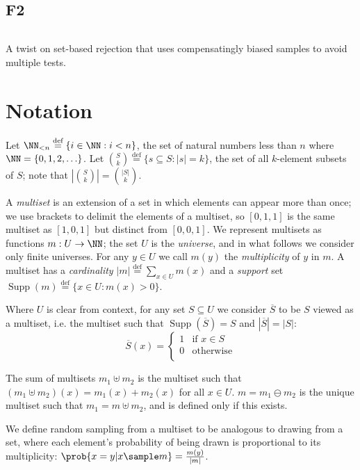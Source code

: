 \documentclass[letterpaper,luatex,11pt]{article}
\newcommand*{\defeq}{\stackrel{\text{def}}{=}}
\DeclareMathOperator{\Supp}{Supp}
\begin{document}
\subsection{F2}
\inputminted{Python}{code/floydf2.py}
A twist on set-based rejection that uses compensatingly biased
samples to avoid multiple tests.
\cite{floydf2}

\section{Notation}

Let \(\NN_{<n} \defeq \{i \in \NN: i < n\}\), the set of natural numbers less than \(n\)
where \(\NN = \{0, 1, 2, \ldots\}\). 
Let \(\binom{S}{k} \defeq \{s \subseteq S: |s| = k\}\), the set of all \(k\)-element subsets
of \(S\); note that \(\left|\binom{S}{k}\right| = \binom{|S|}{k}\).

A \emph{multiset} is an extension of a set in which elements can appear more than once;
we use brackets to delimit the elements of a multiset, so
$[0, 1, 1]$ is the same multiset as $[1, 0, 1]$ but distinct from $[0, 0, 1]$.
We represent multisets as functions $m: U \rightarrow \NN$; the set $U$ is the \emph{universe},
and in what follows we consider only finite universes. For any $y \in U$ we call
$m(y)$ the \emph{multiplicity} of $y$ in $m$.
A multiset has a \emph{cardinality} $|m| \defeq \sum_{x \in U} m(x)$
and a \emph{support} set $\Supp(m) \defeq \{x \in U: m(x) > 0\}$.

Where $U$ is clear from context, for any set $S \subseteq U$ we consider
$\overline{S}$ to be $S$ viewed as a multiset, i.e. the multiset
such that $\Supp(\overline{S}) = S$ and $|\overline{S}| = |S|$:
\begin{displaymath}
    \overline{S}(x) =
    \begin{cases}
        1 & \text{if $x \in S$} \\
        0 & \text{otherwise} \\
    \end{cases}
\end{displaymath}

The sum of multisets $m_1 \uplus m_2$ is the multiset such that
$(m_1 \uplus m_2)(x) = m_1(x) + m_2(x)$ for all $x \in U$.
$m = m_1 \ominus m_2$ is the unique multiset such that $m_1 = m \uplus m_2$,
and is defined only if this exists.

We define random sampling from a multiset to be analogous to drawing from a set,
where each element's probability of being drawn is proportional to its multiplicity:
$\prob{x = y |x \sample m} = \frac{m(y)}{|m|}$.
\end{document}
